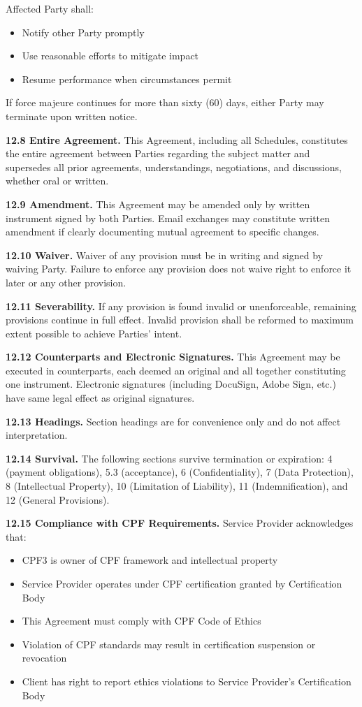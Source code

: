 \documentclass[11pt,a4paper]{article}
\begin{document}
Affected Party shall:
\begin{itemize}
\item Notify other Party promptly
\item Use reasonable efforts to mitigate impact
\item Resume performance when circumstances permit
\end{itemize}

If force majeure continues for more than sixty (60) days, either Party may terminate upon written notice.

\textbf{12.8 Entire Agreement.} This Agreement, including all Schedules, constitutes the entire agreement between Parties regarding the subject matter and supersedes all prior agreements, understandings, negotiations, and discussions, whether oral or written.

\textbf{12.9 Amendment.} This Agreement may be amended only by written instrument signed by both Parties. Email exchanges may constitute written amendment if clearly documenting mutual agreement to specific changes.

\textbf{12.10 Waiver.} Waiver of any provision must be in writing and signed by waiving Party. Failure to enforce any provision does not waive right to enforce it later or any other provision.

\textbf{12.11 Severability.} If any provision is found invalid or unenforceable, remaining provisions continue in full effect. Invalid provision shall be reformed to maximum extent possible to achieve Parties' intent.

\textbf{12.12 Counterparts and Electronic Signatures.} This Agreement may be executed in counterparts, each deemed an original and all together constituting one instrument. Electronic signatures (including DocuSign, Adobe Sign, etc.) have same legal effect as original signatures.

\textbf{12.13 Headings.} Section headings are for convenience only and do not affect interpretation.

\textbf{12.14 Survival.} The following sections survive termination or expiration: 4 (payment obligations), 5.3 (acceptance), 6 (Confidentiality), 7 (Data Protection), 8 (Intellectual Property), 10 (Limitation of Liability), 11 (Indemnification), and 12 (General Provisions).

\textbf{12.15 Compliance with CPF Requirements.} Service Provider acknowledges that:
\begin{itemize}
\item CPF3 is owner of CPF framework and intellectual property
\item Service Provider operates under CPF certification granted by Certification Body
\item This Agreement must comply with CPF Code of Ethics
\item Violation of CPF standards may result in certification suspension or revocation
\item Client has right to report ethics violations to Service Provider's Certification Body
\end{itemize}
\end{document}
